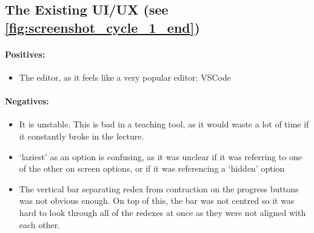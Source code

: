 \subsection{The Existing UI/UX (see \ref{fig:screenshot_cycle_1_end})}
\paragraph{Positives:}
\begin{itemize}
    \item The editor, as it feels like a very popular editor: VSCode
\end{itemize}

\paragraph{Negatives:}
\begin{itemize}
    \item It is unstable. This is bad in a teaching tool, as it would waste a lot of time if it constantly broke in the lecture. 
    \item `laziest' as an option is confusing, as it was unclear if it was referring to one of the other on screen options, or if it was referencing a `hidden' option
    \item The vertical bar separating redex from contraction on the progress buttons was not obvious enough. On top of this, the bar was not centred so it was hard to look through all of the redexes at once as they were not aligned with each other. 
\end{itemize}

